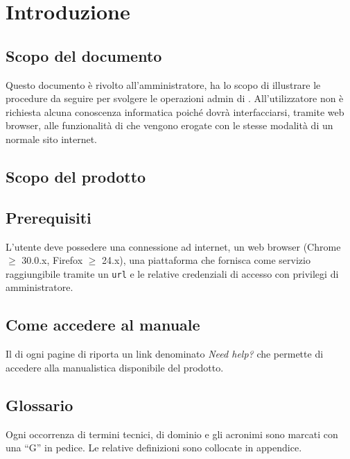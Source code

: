 \section{Introduzione}


	\subsection{Scopo del documento}
	Questo documento è rivolto all'amministratore, ha lo scopo di illustrare le procedure da seguire per svolgere le operazioni admin di . All'utilizzatore non è richiesta alcuna conoscenza informatica poiché dovrà interfacciarsi, tramite web browser, alle funzionalità di  che vengono erogate con le stesse modalità di un normale sito internet.

	\subsection{Scopo del prodotto}
	\ScopoDelProdotto{}

	\subsection{Prerequisiti}
	L'utente deve possedere una connessione ad internet, un web browser (Chrome $\geq$ 30.0.x, Firefox $\geq$ 24.x), una piattaforma che fornisca  come servizio raggiungibile tramite un \texttt{url} e le relative credenziali di accesso con privilegi di amministratore.

	\subsection{Come accedere al manuale}
	Il  di ogni pagine di  riporta un link denominato \emph{Need help?} che permette di accedere alla manualistica disponibile del prodotto.
	

	\subsection{Glossario}
	Ogni occorrenza di termini tecnici, di dominio e gli acronimi sono marcati con una ``G'' in pedice. Le relative definizioni sono collocate in appendice.
	